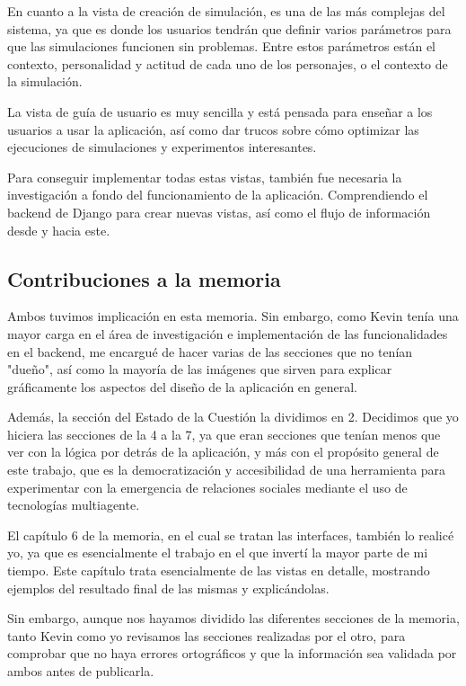 En cuanto a la vista de creación de simulación, es una de las más complejas del sistema, ya que es donde los usuarios tendrán que definir varios parámetros para que las simulaciones funcionen sin problemas. Entre estos parámetros están el contexto, personalidad y actitud de cada uno de los personajes, o el contexto de la simulación.

La vista de guía de usuario es muy sencilla y está pensada para enseñar a los usuarios a usar la aplicación, así como dar trucos sobre cómo optimizar las ejecuciones de simulaciones y experimentos interesantes.

Para conseguir implementar todas estas vistas, también fue necesaria la investigación a fondo del funcionamiento de la aplicación. Comprendiendo el backend de Django para crear nuevas vistas, así como el flujo de información desde y hacia este.

\subsection*{Contribuciones a la memoria}

Ambos tuvimos implicación en esta memoria. Sin embargo, como Kevin tenía una mayor carga en el área de investigación e implementación de las funcionalidades en el backend, me encargué de hacer varias de las secciones que no tenían "dueño", así como la mayoría de las imágenes que sirven para explicar gráficamente los aspectos del diseño de la aplicación en general.

Además, la sección del Estado de la Cuestión la dividimos en 2. Decidimos que yo hiciera las secciones de la 4 a la 7, ya que eran secciones que tenían menos que ver con la lógica por detrás de la aplicación, y más con el propósito general de este trabajo, que es la democratización y accesibilidad de una herramienta para experimentar con la emergencia de relaciones sociales mediante el uso de tecnologías multiagente.

El capítulo 6 de la memoria, en el cual se tratan las interfaces, también lo realicé yo, ya que es esencialmente el trabajo en el que invertí la mayor parte de mi tiempo. Este capítulo trata esencialmente de las vistas en detalle, mostrando ejemplos del resultado final de las mismas y explicándolas.

Sin embargo, aunque nos hayamos dividido las diferentes secciones de la memoria, tanto Kevin como yo revisamos las secciones realizadas por el otro, para comprobar que no haya errores ortográficos y que la información sea validada por ambos antes de publicarla.

